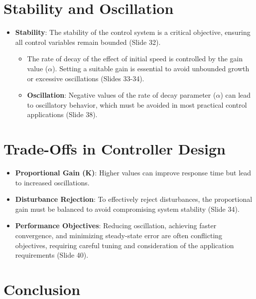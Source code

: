 \documentclass[
  14pt,
  a4paper,
  numbers=noendperiod,
  headinclude=true,
  footinclude=true,
  DIV=calc]{scrreprt}
\providecommand{\tightlist}{%
  \setlength{\itemsep}{0pt}\setlength{\parskip}{0pt}}\usepackage{longtable,booktabs,array}
\begin{document}
\section{Stability and Oscillation}\label{stability-and-oscillation}

\begin{itemize}
\item
  \textbf{Stability}: The stability of the control system is a critical
  objective, ensuring all control variables remain bounded (Slide 32).

  \begin{itemize}
  \item
    The rate of decay of the effect of initial speed is controlled by
    the gain value (\(\alpha\)). Setting a suitable gain is essential to
    avoid unbounded growth or excessive oscillations (Slides 33-34).
  \item
    \textbf{Oscillation}: Negative values of the rate of decay parameter
    (\(\alpha\)) can lead to oscillatory behavior, which must be avoided
    in most practical control applications (Slide 38).
  \end{itemize}
\end{itemize}

\section{Trade-Offs in Controller
Design}\label{trade-offs-in-controller-design}

\begin{itemize}
\tightlist
\item
  \textbf{Proportional Gain (Κ)}: Higher values can improve response
  time but lead to increased oscillations.
\item
  \textbf{Disturbance Rejection}: To effectively reject disturbances,
  the proportional gain must be balanced to avoid compromising system
  stability (Slide 34).
\item
  \textbf{Performance Objectives}: Reducing oscillation, achieving
  faster convergence, and minimizing steady-state error are often
  conflicting objectives, requiring careful tuning and consideration of
  the application requirements (Slide 40).
\end{itemize}

\section{Conclusion}\label{conclusion-7}
\end{document}
